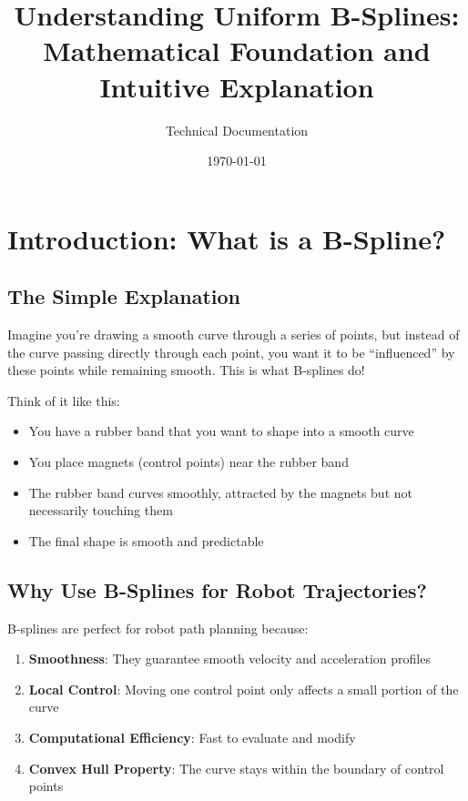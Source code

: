 \documentclass[12pt,a4paper]{article}
\title{Understanding Uniform B-Splines: Mathematical Foundation and Intuitive Explanation}
\author{Technical Documentation}
\date{\today}
\begin{document}
\maketitle

\tableofcontents
\newpage

\section{Introduction: What is a B-Spline?}

\subsection{The Simple Explanation}

Imagine you're drawing a smooth curve through a series of points, but instead of the curve passing directly through each point, you want it to be ``influenced'' by these points while remaining smooth. This is what B-splines do!

Think of it like this:
\begin{itemize}
    \item You have a rubber band that you want to shape into a smooth curve
    \item You place magnets (control points) near the rubber band
    \item The rubber band curves smoothly, attracted by the magnets but not necessarily touching them
    \item The final shape is smooth and predictable
\end{itemize}

\subsection{Why Use B-Splines for Robot Trajectories?}

B-splines are perfect for robot path planning because:
\begin{enumerate}
    \item \textbf{Smoothness}: They guarantee smooth velocity and acceleration profiles
    \item \textbf{Local Control}: Moving one control point only affects a small portion of the curve
    \item \textbf{Computational Efficiency}: Fast to evaluate and modify
    \item \textbf{Convex Hull Property}: The curve stays within the boundary of control points
\end{enumerate}
\end{document}
